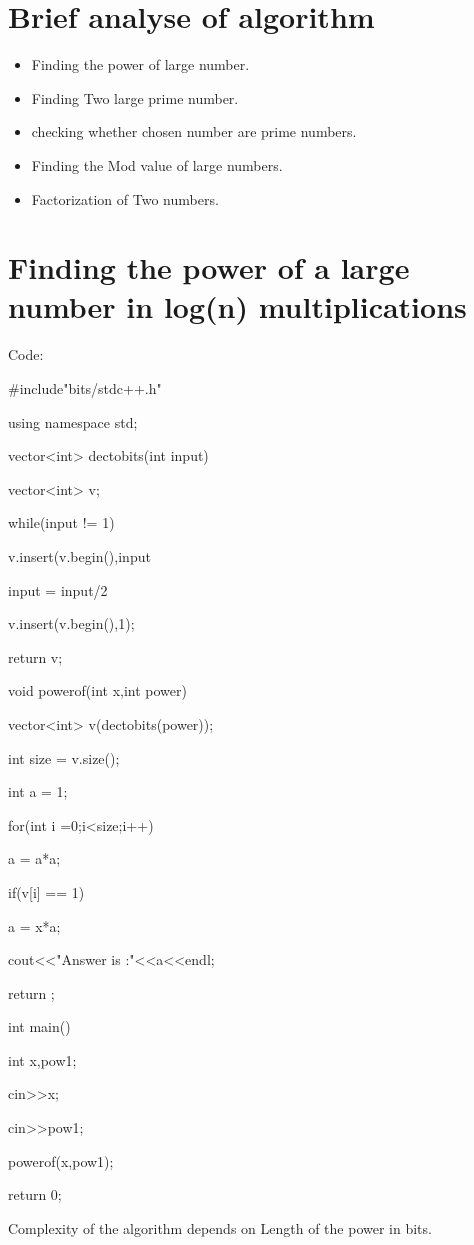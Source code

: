 \documentclass[12pt,a4paper]{report}
\begin{document}
\section{Brief analyse of algorithm}
\begin{itemize}
\item Finding the power of large number.
\item Finding Two large prime number.
\item checking whether chosen number are prime numbers.
\item Finding the Mod value of large numbers.
\item Factorization of Two numbers.
\end{itemize}
\section*{Finding the power of a large number in log(n) multiplications}
Code:
\begin{itemize}
\item \#include"bits/stdc++.h"
\item using namespace std;
\item vector<int> dectobits(int input){
\item	vector<int> v;
\item	while(input != 1){
\item		v.insert(v.begin(),input%
\item		input = input/2
\item	}
\item	v.insert(v.begin(),1);
\item	return v;
\item }
\item void powerof(int x,int power){
\item	vector<int> v(dectobits(power));
\item	int size = v.size();
\item	int a = 1;
\item	for(int i =0;i<size;i++){
\item		a = a*a;
\item		if(v[i] == 1){
\item			a = x*a;
\item		}
\item	}
\item	cout<<"Answer is :"<<a<<endl;
\item	return ;
\item }
\item int main(){
\item	int x,pow1;
\item	cin>>x;
\item	cin>>pow1;
\item	powerof(x,pow1);
\item	return 0;
\item } 
\item Complexity of the algorithm depends on Length of the power in bits.
\end{itemize}
\end{document}
